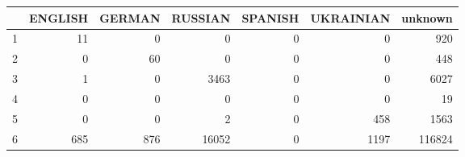 \begin{table}[ht]
\centering
\begin{tabular}{rrrrrrr}
  \hline
 & ENGLISH & GERMAN & RUSSIAN & SPANISH & UKRAINIAN & unknown \\ 
  \hline
1 &  11 &   0 &   0 &   0 &   0 & 920 \\ 
  2 &   0 &  60 &   0 &   0 &   0 & 448 \\ 
  3 &   1 &   0 & 3463 &   0 &   0 & 6027 \\ 
  4 &   0 &   0 &   0 &   0 &   0 &  19 \\ 
  5 &   0 &   0 &   2 &   0 & 458 & 1563 \\ 
  6 & 685 & 876 & 16052 &   0 & 1197 & 116824 \\ 
   \hline
\end{tabular}
\end{table}
